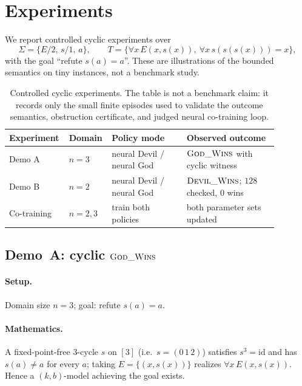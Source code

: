 \documentclass[11pt]{article}
\theoremstyle{definition}
\theoremstyle{plain}
\newcommand{\Sig}{\Sigma}
\newcommand{\Thy}{T}
\begin{document}
\section{Experiments}
\label{sec:experiments}

We report controlled cyclic experiments over
\[
  \Sig=\{E/2,\,s/1,\,a\},\qquad
  \Thy=\{\forall x\,E(x,s(x)),\ \forall x\,s(s(s(x)))=x\},
\]
with the goal ``refute $s(a)=a$''. These are illustrations of the bounded semantics on tiny
instances, not a benchmark study.


\begin{table}[t]
\centering
\small
\begin{tabular}{@{}p{0.16\linewidth}p{0.12\linewidth}p{0.27\linewidth}p{0.33\linewidth}@{}}
\toprule
Experiment & Domain & Policy mode & Observed outcome \\
\midrule
Demo A & $n=3$ & neural Devil / neural God & $\textsc{God\_Wins}$ with cyclic witness \\
Demo B & $n=2$ & neural Devil / neural God & $\textsc{Devil\_Wins}$; $128$ checked, $0$ wins \\
Co-training & $n=2,3$ & train both policies & both parameter sets updated \\
\bottomrule
\end{tabular}
\caption{Controlled cyclic experiments.  The table is not a benchmark claim: it records only the
small finite episodes used to validate the outcome semantics, obstruction certificate, and judged neural
co-training loop.}
\label{tab:cyclic-experiments}
\end{table}

\subsection{Demo~A: cyclic $\textsc{God\_Wins}$}

\paragraph{Setup.} Domain size $n=3$; goal: refute $s(a)=a$.

\paragraph{Mathematics.} A fixed-point-free $3$-cycle $s$ on $[3]$ (i.e.\ $s=(0\,1\,2)$)
satisfies $s^3=\mathrm{id}$ and has $s(a)\neq a$ for every $a$; taking $E=\{(x,s(x))\}$
realizes $\forall x\,E(x,s(x))$. Hence a $(k,b)$-model achieving the goal exists.
\end{document}
